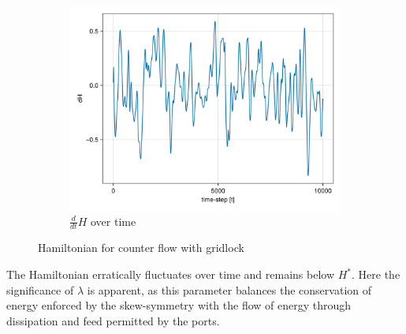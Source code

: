 \begin{itemize}
\begin{figure}[H]
\begin{subfigure}{.49\textwidth}
            \includegraphics[width=\linewidth]{figures/ch5_collective/dH_gridlock_counter.png}
            \caption{$\frac{d}{dt}H$ over time}
            \label{plot:countergridlock_dh}
        \end{subfigure}
        \caption{Hamiltonian for counter flow with gridlock}
        \label{plot:countergridlock_hamiltonian}
    \end{figure}


The Hamiltonian erratically fluctuates over time and remains below $H^*$. Here the significance of $\lambda$ is apparent, as this parameter balances the conservation of energy enforced by the skew-symmetry with the flow of energy through dissipation and feed permitted by the ports.


\end{itemize}
